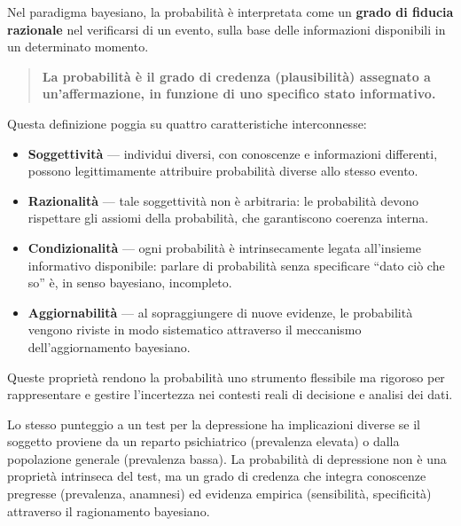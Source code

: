 \documentclass[
  italian,
  letterpaper,
  a4paper,
  11pt,
  open=any]{scrbook}
\providecommand{\tightlist}{%
  \setlength{\itemsep}{0pt}\setlength{\parskip}{0pt}}
\theoremstyle{plain}
\theoremstyle{definition}
\theoremstyle{definition}
\theoremstyle{remark}
\begin{document}
Nel paradigma bayesiano, la probabilità è interpretata come un
\textbf{grado di fiducia razionale} nel verificarsi di un evento, sulla
base delle informazioni disponibili in un determinato momento.

\begin{quote}
\textbf{La probabilità è il grado di credenza (plausibilità) assegnato a
un'affermazione, in funzione di uno specifico stato informativo.}
\end{quote}

Questa definizione poggia su quattro caratteristiche interconnesse:

\begin{itemize}
\tightlist
\item
  \textbf{Soggettività} --- individui diversi, con conoscenze e
  informazioni differenti, possono legittimamente attribuire probabilità
  diverse allo stesso evento.
\item
  \textbf{Razionalità} --- tale soggettività non è arbitraria: le
  probabilità devono rispettare gli assiomi della probabilità, che
  garantiscono coerenza interna.
\item
  \textbf{Condizionalità} --- ogni probabilità è intrinsecamente legata
  all'insieme informativo disponibile: parlare di probabilità senza
  specificare ``dato ciò che so'' è, in senso bayesiano, incompleto.
\item
  \textbf{Aggiornabilità} --- al sopraggiungere di nuove evidenze, le
  probabilità vengono riviste in modo sistematico attraverso il
  meccanismo dell'aggiornamento bayesiano.
\end{itemize}

Queste proprietà rendono la probabilità uno strumento flessibile ma
rigoroso per rappresentare e gestire l'incertezza nei contesti reali di
decisione e analisi dei dati.

\begin{tcolorbox}[enhanced jigsaw, arc=.35mm, bottomrule=.15mm, bottomtitle=1mm, breakable, colback=white, colbacktitle=quarto-callout-note-color!10!white, colframe=quarto-callout-note-color-frame, coltitle=black, left=2mm, leftrule=.75mm, opacityback=0, opacitybacktitle=0.6, rightrule=.15mm, title=\textcolor{quarto-callout-note-color}{\faInfo}\hspace{0.5em}{Applicazione clinica}, titlerule=0mm, toprule=.15mm, toptitle=1mm]

Lo stesso punteggio a un test per la depressione ha implicazioni diverse
se il soggetto proviene da un reparto psichiatrico (prevalenza elevata)
o dalla popolazione generale (prevalenza bassa). La probabilità di
depressione non è una proprietà intrinseca del test, ma un grado di
credenza che integra conoscenze pregresse (prevalenza, anamnesi) ed
evidenza empirica (sensibilità, specificità) attraverso il ragionamento
bayesiano.

\end{tcolorbox}
\end{document}

